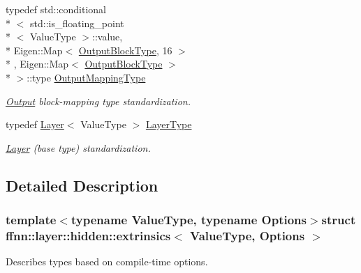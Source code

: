 \begin{DoxyCompactItemize}
typedef std\-::conditional\\*
$<$ std\-::is\-\_\-floating\-\_\-point\\*
$<$ Value\-Type $>$\-::value, \\*
Eigen\-::\-Map$<$ \hyperlink{structffnn_1_1layer_1_1hidden_1_1extrinsics_ac5ca721e2e5843ddcf90351b59c4e56e}{Output\-Block\-Type}, 16 $>$\\*
, Eigen\-::\-Map$<$ \hyperlink{structffnn_1_1layer_1_1hidden_1_1extrinsics_ac5ca721e2e5843ddcf90351b59c4e56e}{Output\-Block\-Type} $>$\\*
 $>$\-::type \hyperlink{structffnn_1_1layer_1_1hidden_1_1extrinsics_a886b2e28314f8641f14407a84af8132c}{Output\-Mapping\-Type}
\begin{DoxyCompactList}\small\item\em \hyperlink{classffnn_1_1layer_1_1_output}{Output} block-\/mapping type standardization. \end{DoxyCompactList}\item 
typedef \hyperlink{classffnn_1_1layer_1_1_layer}{Layer}$<$ Value\-Type $>$ \hyperlink{structffnn_1_1layer_1_1hidden_1_1extrinsics_a06f383c22ed682751b9a4cb8855da9eb}{Layer\-Type}
\begin{DoxyCompactList}\small\item\em \hyperlink{classffnn_1_1layer_1_1_layer}{Layer} (base type) standardization. \end{DoxyCompactList}\end{DoxyCompactItemize}


\subsection{Detailed Description}
\subsubsection*{template$<$typename Value\-Type, typename Options$>$struct ffnn\-::layer\-::hidden\-::extrinsics$<$ Value\-Type, Options $>$}

Describes types based on compile-\/time options. 

